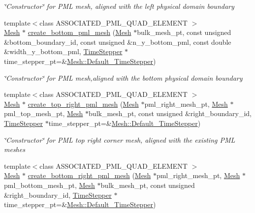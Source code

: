 \begin{DoxyCompactItemize}
\begin{DoxyCompactList}\small\item\em \char`\"{}\+Constructor\char`\"{} for P\+ML mesh, aligned with the left physical domain boundary \end{DoxyCompactList}\item 
{\footnotesize template$<$class A\+S\+S\+O\+C\+I\+A\+T\+E\+D\+\_\+\+P\+M\+L\+\_\+\+Q\+U\+A\+D\+\_\+\+E\+L\+E\+M\+E\+NT $>$ }\\\hyperlink{classoomph_1_1Mesh}{Mesh} $\ast$ \hyperlink{namespaceoomph_1_1TwoDimensionalPMLHelper_acaeafd3af9d2d34e4e7e0f8a2bd78216}{create\+\_\+bottom\+\_\+pml\+\_\+mesh} (\hyperlink{classoomph_1_1Mesh}{Mesh} $\ast$bulk\+\_\+mesh\+\_\+pt, const unsigned \&bottom\+\_\+boundary\+\_\+id, const unsigned \&n\+\_\+y\+\_\+bottom\+\_\+pml, const double \&width\+\_\+y\+\_\+bottom\+\_\+pml, \hyperlink{classoomph_1_1TimeStepper}{Time\+Stepper} $\ast$time\+\_\+stepper\+\_\+pt=\&\hyperlink{classoomph_1_1Mesh_a12243d0fee2b1fcee729ee5a4777ea10}{Mesh\+::\+Default\+\_\+\+Time\+Stepper})
\begin{DoxyCompactList}\small\item\em \char`\"{}\+Constructor\char`\"{} for P\+ML mesh,aligned with the bottom physical domain boundary \end{DoxyCompactList}\item 
{\footnotesize template$<$class A\+S\+S\+O\+C\+I\+A\+T\+E\+D\+\_\+\+P\+M\+L\+\_\+\+Q\+U\+A\+D\+\_\+\+E\+L\+E\+M\+E\+NT $>$ }\\\hyperlink{classoomph_1_1Mesh}{Mesh} $\ast$ \hyperlink{namespaceoomph_1_1TwoDimensionalPMLHelper_a3e37eb00dd89dad4cc51531472c9b1ad}{create\+\_\+top\+\_\+right\+\_\+pml\+\_\+mesh} (\hyperlink{classoomph_1_1Mesh}{Mesh} $\ast$pml\+\_\+right\+\_\+mesh\+\_\+pt, \hyperlink{classoomph_1_1Mesh}{Mesh} $\ast$pml\+\_\+top\+\_\+mesh\+\_\+pt, \hyperlink{classoomph_1_1Mesh}{Mesh} $\ast$bulk\+\_\+mesh\+\_\+pt, const unsigned \&right\+\_\+boundary\+\_\+id, \hyperlink{classoomph_1_1TimeStepper}{Time\+Stepper} $\ast$time\+\_\+stepper\+\_\+pt=\&\hyperlink{classoomph_1_1Mesh_a12243d0fee2b1fcee729ee5a4777ea10}{Mesh\+::\+Default\+\_\+\+Time\+Stepper})
\begin{DoxyCompactList}\small\item\em \char`\"{}\+Constructor\char`\"{} for P\+ML top right corner mesh, aligned with the existing P\+ML meshes \end{DoxyCompactList}\item 
{\footnotesize template$<$class A\+S\+S\+O\+C\+I\+A\+T\+E\+D\+\_\+\+P\+M\+L\+\_\+\+Q\+U\+A\+D\+\_\+\+E\+L\+E\+M\+E\+NT $>$ }\\\hyperlink{classoomph_1_1Mesh}{Mesh} $\ast$ \hyperlink{namespaceoomph_1_1TwoDimensionalPMLHelper_a24327201a96ccb79e34caad6a577672a}{create\+\_\+bottom\+\_\+right\+\_\+pml\+\_\+mesh} (\hyperlink{classoomph_1_1Mesh}{Mesh} $\ast$pml\+\_\+right\+\_\+mesh\+\_\+pt, \hyperlink{classoomph_1_1Mesh}{Mesh} $\ast$pml\+\_\+bottom\+\_\+mesh\+\_\+pt, \hyperlink{classoomph_1_1Mesh}{Mesh} $\ast$bulk\+\_\+mesh\+\_\+pt, const unsigned \&right\+\_\+boundary\+\_\+id, \hyperlink{classoomph_1_1TimeStepper}{Time\+Stepper} $\ast$time\+\_\+stepper\+\_\+pt=\&\hyperlink{classoomph_1_1Mesh_a12243d0fee2b1fcee729ee5a4777ea10}{Mesh\+::\+Default\+\_\+\+Time\+Stepper})

\end{DoxyCompactItemize}
